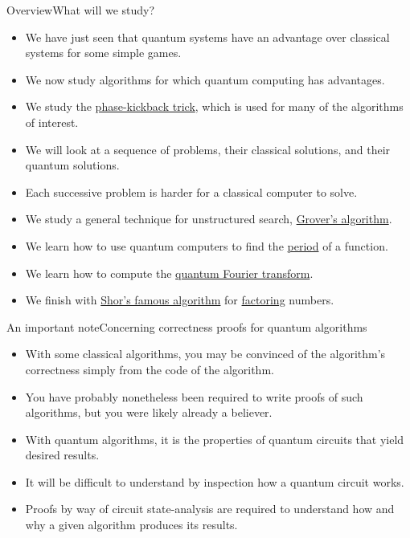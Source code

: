 
\begin{frame}{Overview}{What will we study?}

\begin{itemize}[<+->]
    \item We have just seen that quantum systems have an advantage over classical systems for some simple games.
    \item We now study algorithms for which quantum computing has advantages.
    \item We study the \href{https://qiskit.org/textbook/ch-gates/phase-kickback.html}{phase-kickback trick}, which is used for many of the algorithms of interest.
    \item We will look at a sequence of problems, their classical solutions, and their quantum solutions.
    \item Each successive problem is harder for a classical computer to solve.
    \item We study a general technique for unstructured search, \href{https://en.wikipedia.org/wiki/Grover\%27s_algorithm}{Grover's algorithm}.
    \item We learn how to use quantum computers to find the \href{https://en.wikipedia.org/wiki/Periodic_function}{period} of a function.
    \item We learn how to compute the \href{https://en.wikipedia.org/wiki/Quantum_Fourier_transform}{quantum Fourier transform}.
    \item We finish with \href{https://en.wikipedia.org/wiki/Shor\%27s_algorithm}{Shor's famous algorithm} for \href{https://en.wikipedia.org/wiki/Integer_factorization}{factoring} numbers.
\end{itemize}
    
\end{frame}

\begin{frame}{An important note}{Concerning correctness proofs for quantum algorithms}

\begin{itemize}[<+->]
    \item With some classical algorithms, you may be convinced of the algorithm's correctness simply from the code of the algorithm.
    \item You have probably nonetheless been required to write proofs of such algorithms, but you were likely already a believer.
    \item With quantum algorithms, it is the properties of quantum circuits that yield desired results.
    \item It will be difficult to understand by inspection how a quantum circuit works.
    \item Proofs by way of circuit state-analysis are required to understand how and why a given algorithm produces its results.
\end{itemize}
    
\end{frame}

